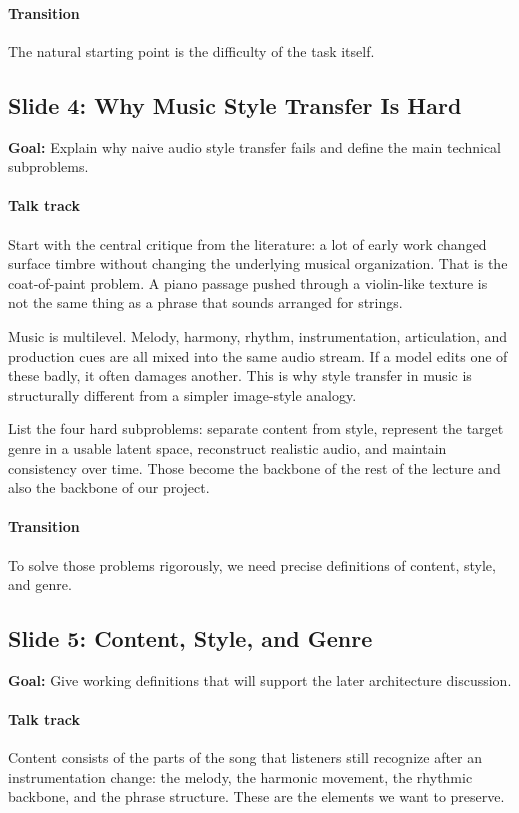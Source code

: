\documentclass[11pt]{article}
\begin{document}
\paragraph{Transition}
The natural starting point is the difficulty of the task itself.

\subsection*{Slide 4: Why Music Style Transfer Is Hard}
\textbf{Goal:} Explain why naive audio style transfer fails and define the main technical subproblems.
\paragraph{Talk track}
Start with the central critique from the literature: a lot of early work changed surface timbre without changing the underlying musical organization. That is the coat-of-paint problem. A piano passage pushed through a violin-like texture is not the same thing as a phrase that sounds arranged for strings.

Music is multilevel. Melody, harmony, rhythm, instrumentation, articulation, and production cues are all mixed into the same audio stream. If a model edits one of these badly, it often damages another. This is why style transfer in music is structurally different from a simpler image-style analogy.

List the four hard subproblems: separate content from style, represent the target genre in a usable latent space, reconstruct realistic audio, and maintain consistency over time. Those become the backbone of the rest of the lecture and also the backbone of our project.

\paragraph{Transition}
To solve those problems rigorously, we need precise definitions of content, style, and genre.

\subsection*{Slide 5: Content, Style, and Genre}
\textbf{Goal:} Give working definitions that will support the later architecture discussion.
\paragraph{Talk track}
Content consists of the parts of the song that listeners still recognize after an instrumentation change: the melody, the harmonic movement, the rhythmic backbone, and the phrase structure. These are the elements we want to preserve.
\end{document}
